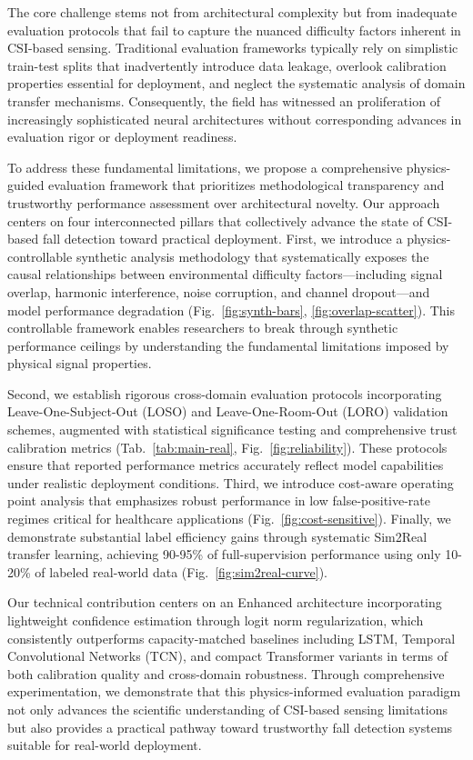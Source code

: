 \documentclass[10pt,conference]{IEEEtran}
\begin{document}
The core challenge stems not from architectural complexity but from inadequate evaluation protocols that fail to capture the nuanced difficulty factors inherent in CSI-based sensing. Traditional evaluation frameworks typically rely on simplistic train-test splits that inadvertently introduce data leakage, overlook calibration properties essential for deployment, and neglect the systematic analysis of domain transfer mechanisms. Consequently, the field has witnessed an proliferation of increasingly sophisticated neural architectures without corresponding advances in evaluation rigor or deployment readiness.

To address these fundamental limitations, we propose a comprehensive physics-guided evaluation framework that prioritizes methodological transparency and trustworthy performance assessment over architectural novelty. Our approach centers on four interconnected pillars that collectively advance the state of CSI-based fall detection toward practical deployment. First, we introduce a physics-controllable synthetic analysis methodology that systematically exposes the causal relationships between environmental difficulty factors—including signal overlap, harmonic interference, noise corruption, and channel dropout—and model performance degradation (Fig.~\ref{fig:synth-bars}, \ref{fig:overlap-scatter}). This controllable framework enables researchers to break through synthetic performance ceilings by understanding the fundamental limitations imposed by physical signal properties.

Second, we establish rigorous cross-domain evaluation protocols incorporating Leave-One-Subject-Out (LOSO) and Leave-One-Room-Out (LORO) validation schemes, augmented with statistical significance testing and comprehensive trust calibration metrics (Tab.~\ref{tab:main-real}, Fig.~\ref{fig:reliability}). These protocols ensure that reported performance metrics accurately reflect model capabilities under realistic deployment conditions. Third, we introduce cost-aware operating point analysis that emphasizes robust performance in low false-positive-rate regimes critical for healthcare applications (Fig.~\ref{fig:cost-sensitive}). Finally, we demonstrate substantial label efficiency gains through systematic Sim2Real transfer learning, achieving 90-95\% of full-supervision performance using only 10-20\% of labeled real-world data (Fig.~\ref{fig:sim2real-curve}).

Our technical contribution centers on an Enhanced architecture incorporating lightweight confidence estimation through logit norm regularization, which consistently outperforms capacity-matched baselines including LSTM, Temporal Convolutional Networks (TCN), and compact Transformer variants in terms of both calibration quality and cross-domain robustness. Through comprehensive experimentation, we demonstrate that this physics-informed evaluation paradigm not only advances the scientific understanding of CSI-based sensing limitations but also provides a practical pathway toward trustworthy fall detection systems suitable for real-world deployment.
\end{document}
